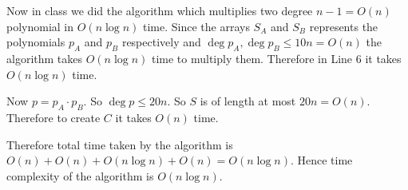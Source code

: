 \documentclass[a4paper, 11pt]{article}
\begin{document}
{ Now in class we did the  algorithm which multiplies two degree $n-1=O(n)$ polynomial in $O(n\log n)$ time. Since the arrays $S_A$ and $S_B$ represents the polynomials $p_A$ and $p_B$ respectively and $\deg p_A,\deg p_B \leq 10n=O(n)$ the  algorithm takes $O(n\log n)$ time to multiply them. Therefore in Line 6 it takes $O(n\log n)$ time.
 
 Now $p=p_A\cdot p_B$. So $\deg p\leq 20n$. So $S$ is of length at most $20n=O(n)$. Therefore to create $C$ it takes $O(n)$ time. 
 
 Therefore total time taken by the algorithm is $O(n)+O(n)+O(n\log n)+O(n)=O(n\log n)$. Hence time complexity of the algorithm is $O(n\log n)$.
}
\newpage



\end{document}
